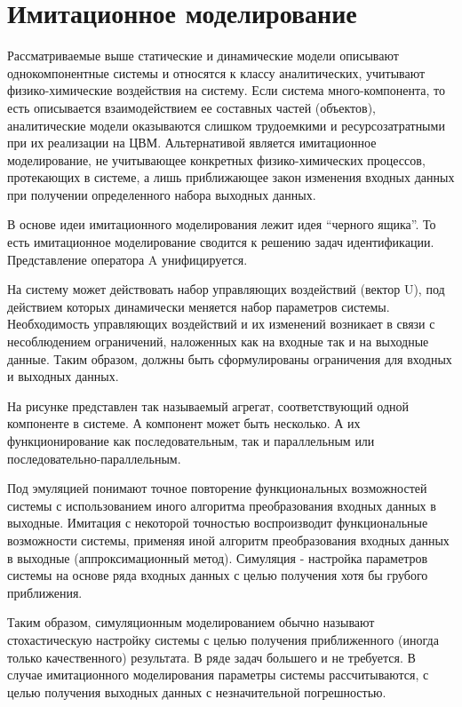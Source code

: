 \documentclass[12pt]{article}
\begin{document}
\newpage
\section{Имитационное моделирование}
Рассматриваемые выше статические и динамические модели описывают однокомпонентные системы и относятся к классу аналитических, учитывают физико-химические воздействия на систему. Если система много-компонента, то есть описывается взаимодействием ее составных частей (объектов), аналитические модели оказываются слишком трудоемкими и ресурсозатратными при их реализации на ЦВМ. Альтернативой является имитационное моделирование, не учитывающее конкретных физико-химических процессов, протекающих в системе, а лишь приближающее закон изменения входных данных при получении определенного набора выходных данных.

В основе идеи имитационного моделирования лежит идея \enquote{черного ящика}. То есть имитационное моделирование сводится к решению задач идентификации. Представление оператора A унифицируется.

На систему может действовать набор управляющих воздействий (вектор U), под действием которых динамически меняется набор параметров системы. Необходимость управляющих воздействий и их изменений возникает в связи с несоблюдением ограничений, наложенных как на входные так и на выходные данные. Таким образом, должны быть сформулированы ограничения для входных и выходных данных.

На рисунке представлен так называемый агрегат, соответствующий одной компоненте в системе. А компонент может быть несколько. А их функционирование как последовательным, так и параллельным или последовательно-параллельным.

Под эмуляцией понимают точное повторение функциональных возможностей системы с использованием иного алгоритма преобразования входных данных в выходные. Имитация с некоторой точностью воспроизводит функциональные возможности системы, применяя иной алгоритм преобразования входных данных в выходные (аппроксимационный метод). Симуляция  - настройка параметров системы на основе ряда входных данных с целью получения хотя бы грубого приближения.

Таким образом, симуляционным моделированием обычно называют стохастическую настройку системы с целью получения приближенного (иногда только качественного) результата. В ряде задач большего и не требуется. В случае имитационного моделирования параметры системы рассчитываются, с целью получения выходных данных с незначительной погрешностью.
\end{document}
